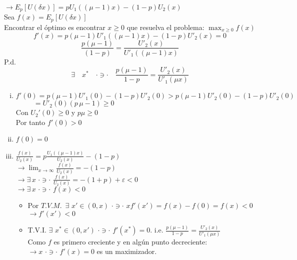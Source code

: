  $\rightarrow E_p[U(\delta x)]=pU_1((\mu-1)x)-(1-p)U_2(x)$\\

 Sea $f(x)=E_p[U(\delta x)]$\\

 Encontrar el óptimo es encontrar $x \ge 0$ que resuelva el problema: $\displaystyle \max_{x\ge0}f(x)$\\

 \[f'(x)=p(\mu-1)U'_1((\mu-1)x)-(1-p)U'_2(x)=0\]
 \[\frac{p(\mu-1)}{(1-p)}=\frac{U'_2(x)}{U'_1((\mu-1)x)}\]
 P.d.$$\exists \quad x^* \quad \cdot \ni \cdot \quad \frac{p(\mu-1)}{1-p}=\frac{U'_2(x)}{U'_1(\mu x)}$$

 \begin{enumerate}[(i)]

  \item $f'(0)=p(\mu-1)U'_1(0)-(1-p)U'_2(0)>p(\mu-1)U'_2(0)-(1-p)U'_2(0)$\\
 
  $\,\,\,\quad\quad=U'_2(0)(p\,\mu-1)\ge 0$\\
 
  Con $U_2'(0)\ge 0$ y $p\mu\ge0$\\
  Por tanto $f'(0)>0$
 
  \item $f(0)=0$
  \item $\displaystyle\frac{f(x)}{U_2(x)}=p\displaystyle\frac{U_1((\mu-1)x)}{U_2(x)}-(1-p)$\\
  $\rightarrow \displaystyle \lim_{x\rightarrow\infty}\frac{f(x)}{U_2(x)}=-(1-p)$\\
 
  $\rightarrow \exists \, x\,\,\cdot \ni \cdot \,\, \displaystyle\frac{f(x)}{U_2(x)}=-(1+p)+\varepsilon<0$\\
 
  $\rightarrow \exists\,x\,\,\cdot \ni \cdot \,\,f(x)<0$
  \begin{itemize}
   \item Por $T.V.M.\,\,\,\exists\,\, x'\in(0,x)\,\,\cdot \ni \cdot \,\,xf'(x')=f(x)-f(0)=f(x)<0$\\
   $\rightarrow f'(x')<0$
   \item T.V.I. $\exists\,\, x^*\in(0,x')\,\,\cdot \ni \cdot \,\,f'(x^*)=0$. i.e. $\displaystyle\frac{p(\mu-1)}{1-p}=\displaystyle\frac{U'_2(x)}{U'_1(\mu x)}$\\
  
   Como $f$ es primero creciente y en algún punto decreciente:\\
   $\rightarrow x\,\,\cdot \ni\cdot\,\,f'(x)=0$ es un maximizador.
  \end{itemize}
 \end{enumerate}


